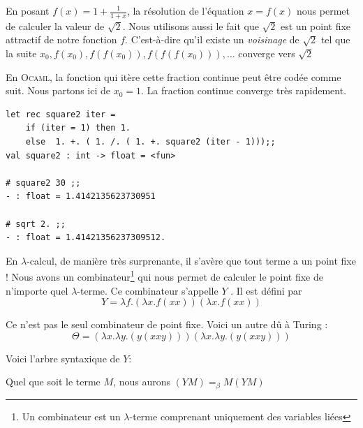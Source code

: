 En posant $ f(x) = 1 + \frac{1}{1+x} $, la résolution de l'équation $x=f(x)$ nous permet
de calculer la valeur de $\sqrt{2}$. Nous utilisons aussi le fait que $\sqrt{2}$ est 
un point fixe attractif de notre fonction $f$. C'est-à-dire qu'il existe un \textit{voisinage} de 
$\sqrt{2}$ tel que la suite $ x_0,f(x_0),f(f(x_0)),f(f(f(x_0))),\dots $ converge vers $\sqrt{2}$


En \textsc{Ocaml}, la fonction qui it\`{e}re cette fraction continue peut être codée comme suit. 
Nous partons ici de $x_0 =1$. La fraction continue converge très rapidement.
\begin{Verbatim}
let rec square2 iter =
	if (iter = 1) then 1.
	else  1. +. ( 1. /. ( 1. +. square2 (iter - 1)));;
val square2 : int -> float = <fun>

# square2 30 ;;
- : float = 1.4142135623730951

# sqrt 2. ;;
- : float = 1.41421356237309512.

\end{Verbatim}


En $\lambda $-calcul, de manière très surprenante, il s'avère que tout terme a un point fixe !
Nous avons un combinateur\footnote{Un combinateur est un $\lambda$-terme comprenant uniquement 
des variables li\'{e}es} qui nous permet de calculer le point fixe de n'importe quel $\lambda $-terme.
Ce combinateur s'appelle $Y$ . Il est défini par $$ Y=  \lambda f.(\lambda x.f(x x))(\lambda x.f(x x)) $$

Ce n'est pas le seul combinateur de point fixe. Voici un autre d\^{u} \`{a} Turing :
 $$\Theta = (\lambda x. \lambda y. (y (x x y))) (\lambda x. \lambda y. (y (x x y)))$$

Voici l'arbre syntaxique de $Y$:
\begin{center}
\end{center}
Quel que soit le terme $M$, nous aurons  $(YM) = _\beta M(YM)$



